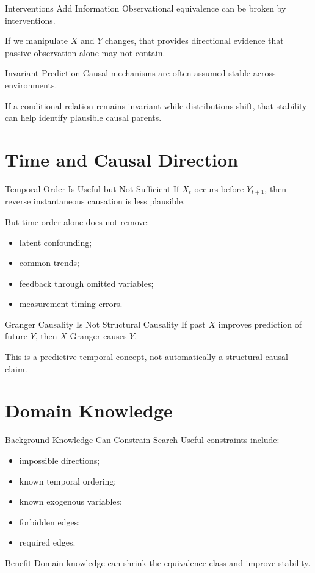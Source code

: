 \documentclass[aspectratio=169,11pt]{beamer}
\begin{document}
\begin{frame}{Interventions Add Information}
Observational equivalence can be broken by interventions.

If we manipulate \(X\) and \(Y\) changes, that provides directional evidence that passive observation alone may not contain.
\end{frame}

\begin{frame}{Invariant Prediction}
Causal mechanisms are often assumed stable across environments.

If a conditional relation remains invariant while distributions shift, that stability can help identify plausible causal parents.
\end{frame}

\section{Time and Causal Direction}

\begin{frame}{Temporal Order Is Useful but Not Sufficient}
If \(X_t\) occurs before \(Y_{t+1}\), then reverse instantaneous causation is less plausible.

But time order alone does not remove:
\begin{itemize}
\item latent confounding;
\item common trends;
\item feedback through omitted variables;
\item measurement timing errors.
\end{itemize}
\end{frame}

\begin{frame}{Granger Causality Is Not Structural Causality}
If past \(X\) improves prediction of future \(Y\), then \(X\) Granger-causes \(Y\).

This is a predictive temporal concept, not automatically a structural causal claim.
\end{frame}

\section{Domain Knowledge}

\begin{frame}{Background Knowledge Can Constrain Search}
Useful constraints include:
\begin{itemize}
\item impossible directions;
\item known temporal ordering;
\item known exogenous variables;
\item forbidden edges;
\item required edges.
\end{itemize}

\begin{block}{Benefit}
Domain knowledge can shrink the equivalence class and improve stability.
\end{block}
\end{frame}
\end{document}
